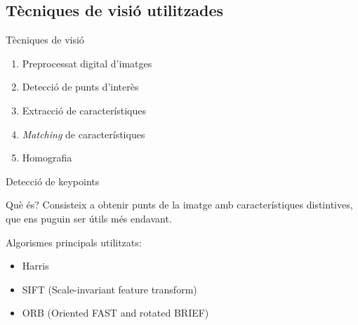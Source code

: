 \documentclass[xcolor=table, 11pt]{beamer}
\newcommand\tz{\fontsize{13}{15.6}\selectfont}
\begin{document}

	\begin{frame}[plain]
		\section{Tècniques de visió utilitzades}
	\end{frame}

	\begin{frame}{Tècniques de visió}
		\tz
		\begin{enumerate}
			\item Preprocessat digital d'imatges
			\item Detecció de punts d'interès
			\item Extracció de característiques
			\item \textit{Matching} de característiques
			\item Homografia
		\end{enumerate}
	\end{frame}

	\begin{frame}{Detecció de keypoints}
		\tz
		\begin{block}{Què és?}
			Consisteix a obtenir punts de la imatge amb característiques distintives, que ens puguin ser útils més endavant.
		\end{block}
		Algorismes principals utilitzats:
		\begin{itemize}
			\item Harris\cite{Harris}
			\item SIFT\cite{SIFT} (Scale-invariant feature transform)
			\item ORB\cite{Rublee:2011:OEA:2355573.2356268} (Oriented FAST and rotated BRIEF)
		\end{itemize}
	\end{frame}
\end{document}

